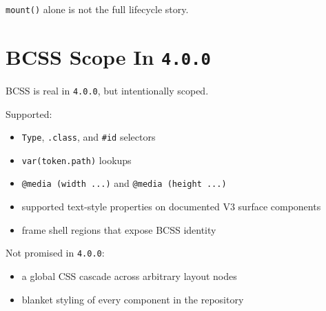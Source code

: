 \texttt{m\allowbreak{}o\allowbreak{}u\allowbreak{}n\allowbreak{}t\allowbreak{}(\allowbreak{})} alone is not the full lifecycle story.

\section{\texorpdfstring{BCSS Scope In \texttt{4\allowbreak{}.\allowbreak{}0\allowbreak{}.\allowbreak{}0}}{BCSS Scope In }}\label{record-010-bcss-scope-in-4.0.0}

BCSS is real in \texttt{4\allowbreak{}.\allowbreak{}0\allowbreak{}.\allowbreak{}0}, but intentionally scoped.

Supported:

\begin{itemize}
\tightlist
\item
  \texttt{T\allowbreak{}y\allowbreak{}p\allowbreak{}e}, \texttt{.\allowbreak{}c\allowbreak{}l\allowbreak{}a\allowbreak{}s\allowbreak{}s}, and \texttt{\#\allowbreak{}i\allowbreak{}d} selectors
\item
  \texttt{v\allowbreak{}a\allowbreak{}r\allowbreak{}(\allowbreak{}t\allowbreak{}o\allowbreak{}k\allowbreak{}e\allowbreak{}n\allowbreak{}.\allowbreak{}p\allowbreak{}a\allowbreak{}t\allowbreak{}h\allowbreak{})} lookups
\item
  \texttt{@\allowbreak{}m\allowbreak{}e\allowbreak{}d\allowbreak{}i\allowbreak{}a\allowbreak{} \allowbreak{}(\allowbreak{}w\allowbreak{}i\allowbreak{}d\allowbreak{}t\allowbreak{}h\allowbreak{} \allowbreak{}.\allowbreak{}.\allowbreak{}.\allowbreak{})} and \texttt{@\allowbreak{}m\allowbreak{}e\allowbreak{}d\allowbreak{}i\allowbreak{}a\allowbreak{} \allowbreak{}(\allowbreak{}h\allowbreak{}e\allowbreak{}i\allowbreak{}g\allowbreak{}h\allowbreak{}t\allowbreak{} \allowbreak{}.\allowbreak{}.\allowbreak{}.\allowbreak{})}
\item
  supported text-style properties on documented V3 surface components
\item
  frame shell regions that expose BCSS identity
\end{itemize}

Not promised in \texttt{4\allowbreak{}.\allowbreak{}0\allowbreak{}.\allowbreak{}0}:

\begin{itemize}
\tightlist
\item
  a global CSS cascade across arbitrary layout nodes
\item
  blanket styling of every component in the repository
\end{itemize}

